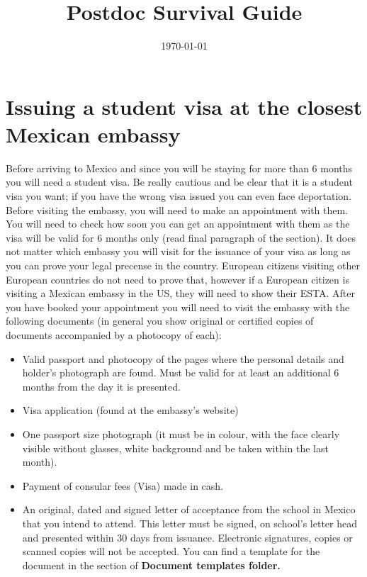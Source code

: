 \documentclass{article}
\title{Postdoc Survival Guide}
\author{}
\date{\today}
\begin{document}
\maketitle

\section{Issuing a student visa at the closest Mexican embassy}

Before arriving to Mexico and since you will be staying for more than 6 months you will need a student visa. Be really cautious and be clear that it is a student visa you want; if you have the wrong visa issued you can even face deportation. Before visiting the embassy, you will need to make an appointment with them. You will need to check how soon you can get an appointment with them as the visa will be valid for 6 months only (read final paragraph of the section). It does not matter which embassy you will visit for the issuance of your visa as long as you can prove your legal precense in the country. European citizens visiting other European countries do not need to prove that, however if a European citizen is visiting a Mexican embassy in the US, they will need to show their ESTA. After you have booked your appointment you will need to visit the embassy with the following documents (in general you show original or certified copies of documents accompanied by a photocopy of each):


\begin{itemize}
\item Valid passport and photocopy of the pages where the personal details and holder's photograph are found. Must be valid for at least an additional 6 months from the day it is presented.
\item Visa application (found at the embassy's website)
\item One passport size photograph (it must be in colour, with the face clearly visible without glasses, white background and be taken within the last month). 
\item Payment of consular fees (Visa) made in cash.
\item An original, dated and signed letter of acceptance from the school in Mexico that you intend to attend. This letter must be signed, on school’s letter head and presented within 30 days from issuance. Electronic signatures, copies or scanned copies will not be accepted. You can find a template for the document in the section of \textbf{Document templates folder.}
\end{itemize}
\end{document}
